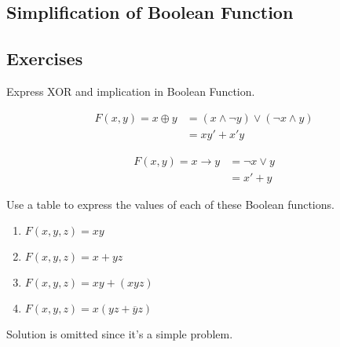     \subsection{Simplification of Boolean Function}


    \subsection{Exercises}
    \begin{exercise}
        Express XOR and implication in Boolean Function.
    \end{exercise}
    \begin{solution}
        \begin{align*}
            F(x,y)= x \oplus y &= (x \land \lnot y) \lor (\lnot x \land y)\\
                       &= xy' + x'y
            \end{align*}

            \begin{align*}
                F(x,y)= x \rightarrow y &= \lnot x \lor y\\
                                &= x' + y
                \end{align*}
    \end{solution}

    \begin{exercise}
        Use a table to express the values of each of these Boolean functions.
        \begin{enumerate}[label=\alph*)]
            \item $F(x, y, z) = xy$
            \item $F(x, y, z) = x + yz$
            \item $F(x, y, z) = xy + (xyz)$
            \item $F(x, y, z) = x(yz + \overline{y}z)$
        \end{enumerate}
            Solution is omitted since it's a simple problem.
    \end{exercise}

